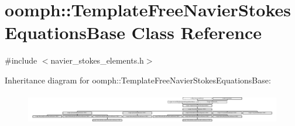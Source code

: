 \hypertarget{classoomph_1_1TemplateFreeNavierStokesEquationsBase}{}\section{oomph\+:\+:Template\+Free\+Navier\+Stokes\+Equations\+Base Class Reference}
\label{classoomph_1_1TemplateFreeNavierStokesEquationsBase}


{\ttfamily \#include $<$navier\+\_\+stokes\+\_\+elements.\+h$>$}

Inheritance diagram for oomph\+:\+:Template\+Free\+Navier\+Stokes\+Equations\+Base\+:\begin{figure}[H]
\begin{center}
\leavevmode
\includegraphics[height=1.361111cm]{classoomph_1_1TemplateFreeNavierStokesEquationsBase}
\end{center}
\end{figure}

